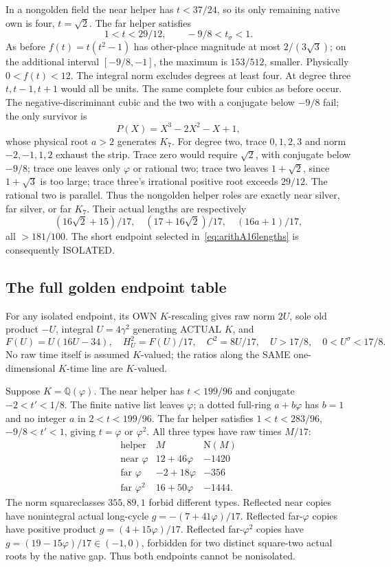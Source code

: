 \documentclass[11pt]{article}
\begin{document}
In a nongolden field the near helper has \(t<37/24\),
so its only remaining native own is four, \(t=\sqrt2\).
The far helper satisfies
\[
                    1<t<29/12,\qquad -9/8<t_\sigma<1.
\]
As before \(f(t)=t(t^2-1)\) has other-place magnitude at most
\(2/(3\sqrt3)\); on the additional interval
\([-9/8,-1]\), the maximum is \(153/512\), smaller.
Physically \(0<f(t)<12\).
The integral norm excludes degrees at least four.
At degree three \(t,t-1,t+1\) would all be units.
The same complete four cubics as before occur.
The negative-discriminant cubic and the two with a conjugate
below \(-9/8\) fail; the only survivor is
\[
                P(X)=X^3-2X^2-X+1,
\]
whose physical root \(a>2\) generates \(K_7\).
For degree two, trace \(0,1,2,3\) and norm
\(-2,-1,1,2\) exhaust the strip.
Trace zero would require \(\sqrt2\), with conjugate below
\(-9/8\); trace one leaves only \(\varphi\) or rational two;
trace two leaves \(1+\sqrt2\), since \(1+\sqrt3\) is too large;
trace three's irrational positive root exceeds \(29/12\).
The rational two is parallel.
Thus the nongolden helper roles are exactly near silver,
far silver, or far \(K_7\).
Their actual lengths are respectively
\[
 (16\sqrt2+15)/17,\quad (17+16\sqrt2)/17,\quad
 (16a+1)/17,
\]
all \(>181/100\).
The short endpoint selected in~\eqref{eq:arithA16lengths}
is consequently ISOLATED.

\subsection{The full golden endpoint table}
\label{app:arithA16golden}

For any isolated endpoint, its OWN \(K\)-rescaling gives
raw norm \(2U\), sole old product \(-U\), integral \(U=4\gamma^2\)
generating ACTUAL \(K\), and
\[
 F(U)=U(16U-34),\quad H_U^2=F(U)/17,\quad C^2=8U/17,
 \quad U>17/8,\quad0<U^\sigma<17/8 .
\tag{A16U}\label{eq:arithA16U}
\]
No raw time itself is assumed \(K\)-valued; the ratios along
the SAME one-dimensional \(K\)-time line are \(K\)-valued.

Suppose \(K=\mathbb Q(\varphi)\).
The near helper has \(t<199/96\) and conjugate
\(-2<t'<1/8\).  The finite native list leaves \(\varphi\);
a dotted full-ring \(a+b\varphi\) has \(b=1\) and no integer
\(a\) in \(2<t<199/96\).
The far helper satisfies \(1<t<283/96\), \(-9/8<t'<1\),
giving \(t=\varphi\) or \(\varphi^2\).
All three types have raw times \(M/17\):
\[
\begin{array}{c|c|r}
\text{helper}&M&\mathrm N(M)\\ \hline
\text{near }\varphi&12+46\varphi&-1420\\
\text{far }\varphi&-2+18\varphi&-356\\
\text{far }\varphi^2&16+50\varphi&-1444 .
\end{array}
\]
The norm squareclasses \(355,89,1\) forbid different types.
Reflected near copies have nonintegral actual long-cycle
\(g=-(7+41\varphi)/17\).
Reflected far-\(\varphi\) copies have positive product
\(g=(4+15\varphi)/17\).
Reflected far-\(\varphi^2\) copies have
\(g=(19-15\varphi)/17\in(-1,0)\), forbidden for two
distinct square-two actual roots by the native gap.
Thus both endpoints cannot be nonisolated.
\end{document}
